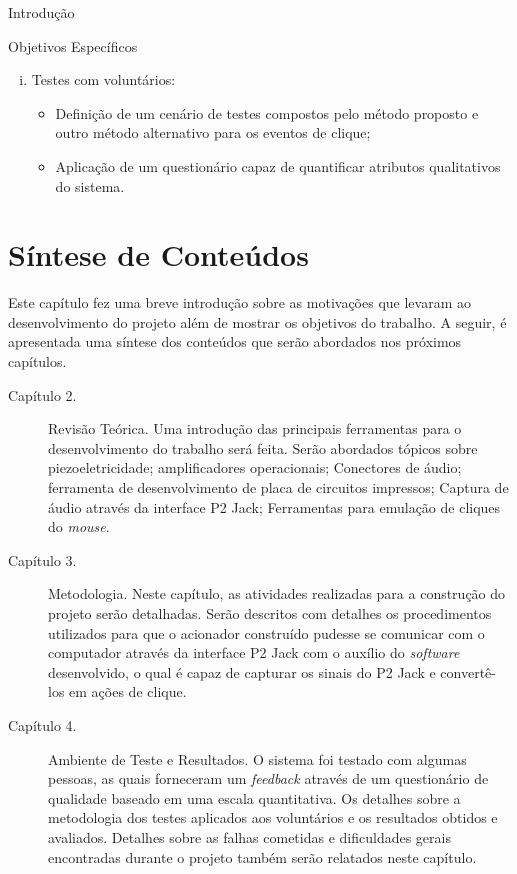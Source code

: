 \begin{chapter}{Introdução}
\begin{subsection}{Objetivos Específicos}
\begin{enumerate}[i)]
	\item Testes com voluntários: \vspace{-.2cm}
	\begin{itemize}
		\item Definição de um cenário de testes compostos pelo método proposto 
		e outro método alternativo para os eventos de clique;
		\item Aplicação de um questionário capaz de quantificar atributos 
		qualitativos do sistema.
	\end{itemize}


\end{enumerate}

\end{subsection}

\section{Síntese de Conteúdos}

Este capítulo fez uma breve introdução sobre as motivações que levaram ao
desenvolvimento do projeto além de mostrar os objetivos do trabalho.
A seguir, é apresentada uma síntese dos conteúdos que serão abordados nos
próximos capítulos.

\begin{description}
	\item[Capítulo 2.] Revisão Teórica.
	Uma introdução das principais ferramentas para o desenvolvimento do trabalho
será feita. Serão abordados tópicos sobre piezoeletricidade; amplificadores
operacionais; Conectores de áudio; ferramenta de desenvolvimento de placa de
circuitos impressos; Captura de áudio através da interface P2 Jack; Ferramentas
para emulação de cliques do \textit{mouse}. 

	\item[Capítulo 3.] Metodologia. 
	Neste capítulo, as atividades realizadas para a construção do projeto serão
	detalhadas. Serão descritos com detalhes os procedimentos utilizados
	para que o acionador construído pudesse se comunicar com o computador
	através da interface P2 Jack com o auxílio do \textit{software} desenvolvido,
	o qual é capaz de capturar os sinais do P2 Jack e convertê-los em ações de
	clique.
	
	\item[Capítulo 4.] Ambiente de Teste e Resultados. 
	O sistema foi testado com algumas pessoas, as quais forneceram um
	\textit{feedback} através de um questionário de qualidade baseado em uma escala
	quantitativa.  Os detalhes sobre a metodologia dos testes aplicados aos voluntários e
	os resultados obtidos e avaliados. Detalhes sobre as falhas cometidas e
	dificuldades gerais encontradas durante o projeto também serão relatados neste
	capítulo.


\end{description}
\end{chapter}
